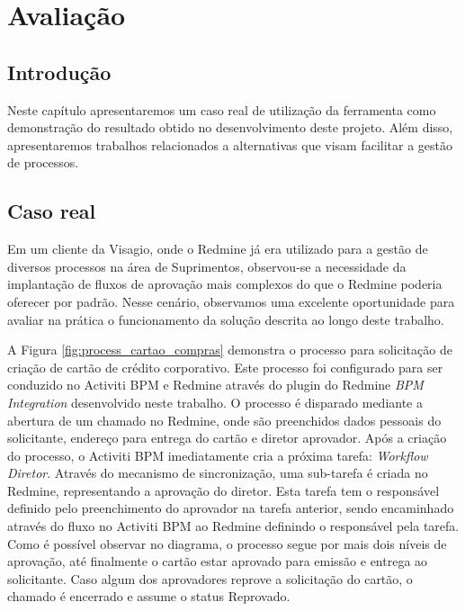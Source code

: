 \chapter{Avaliação}\label{chp:resultado}

\section{Introdução}\label{sec:resultado-introducao}
Neste capítulo apresentaremos um caso real de utilização da ferramenta como demonstração do resultado obtido no desenvolvimento deste projeto. Além disso, apresentaremos trabalhos relacionados a alternativas que visam facilitar a gestão de processos.

\section{Caso real}\label{sec:resultado-caso_real}

Em um cliente da Visagio, onde o Redmine já era utilizado para a gestão de diversos processos na área de Suprimentos, observou-se a necessidade da implantação de fluxos de aprovação mais complexos do que o Redmine poderia oferecer por padrão. Nesse cenário, observamos uma excelente oportunidade para avaliar na prática o funcionamento da solução descrita ao longo deste trabalho.

A Figura \ref{fig:process_cartao_compras} demonstra o processo para solicitação de criação de cartão de crédito corporativo. Este processo foi configurado para ser conduzido no Activiti BPM e Redmine através do plugin do Redmine \textit{BPM Integration} desenvolvido neste trabalho. O processo é disparado mediante a abertura de um chamado no Redmine, onde são preenchidos dados pessoais do solicitante, endereço para entrega do cartão e diretor aprovador. Após a criação do processo, o Activiti BPM imediatamente cria a próxima tarefa: \textit{Workflow Diretor}. Através do mecanismo de sincronização, uma sub-tarefa é criada no Redmine, representando a aprovação do diretor. Esta tarefa tem o responsável definido pelo preenchimento do aprovador na tarefa anterior, sendo encaminhado através do fluxo no Activiti BPM ao Redmine definindo o responsável pela tarefa. Como é possível observar no diagrama, o processo segue por mais dois níveis de aprovação, até finalmente o cartão estar aprovado para emissão e entrega ao solicitante. Caso algum dos aprovadores reprove a solicitação do cartão, o chamado é encerrado e assume o status Reprovado.

